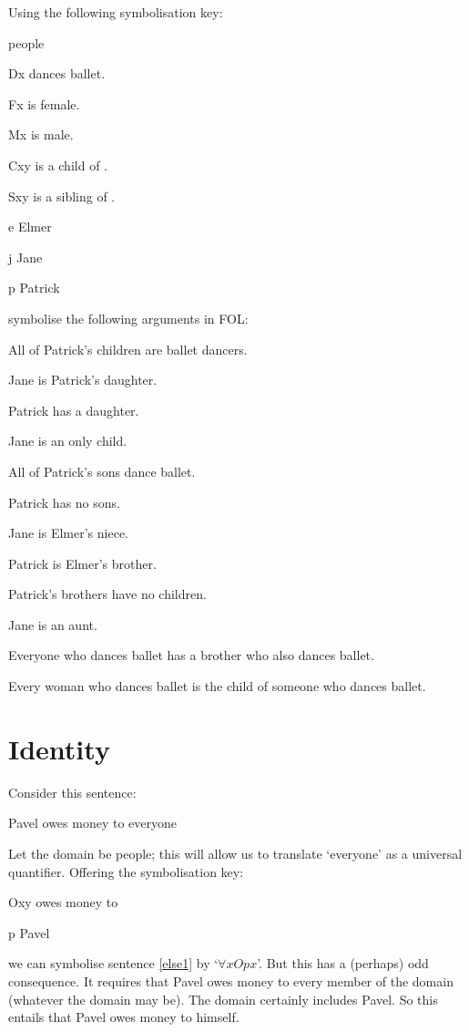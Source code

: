 \solutions
\problempart
\label{pr.FOLballet}
Using the following symbolisation key:
\begin{ekey}
\item[\text{domain}] people
\item[Dx]  dances ballet.
\item[Fx]  is female.
\item[Mx]  is male.
\item[Cxy]  is a child of .
\item[Sxy]  is a sibling of .
\item[e] Elmer
\item[j] Jane
\item[p] Patrick
\end{ekey}
symbolise the following arguments in FOL:
\begin{earg}
\item All of Patrick's children are ballet dancers.
\item Jane is Patrick's daughter.
\item Patrick has a daughter.
\item Jane is an only child.
\item All of Patrick's sons dance ballet.
\item Patrick has no sons.
\item Jane is Elmer's niece.
\item Patrick is Elmer's brother.
\item Patrick's brothers have no children.
\item Jane is an aunt.
\item Everyone who dances ballet has a brother who also dances ballet.
\item Every woman who dances ballet is the child of someone who dances ballet.
\end{earg}


\chapter{Identity}
\label{sec.identity}

Consider this sentence:
\begin{earg}
\item[\ex{else1}] Pavel owes money to everyone
\end{earg}
Let the domain be people; this will allow us to translate `everyone' as a universal quantifier. Offering the symbolisation key:
	\begin{ekey}
		\item[Oxy]  owes money to 
		\item[p] Pavel
	\end{ekey}
we can symbolise sentence \ref{else1} by `$\forall x Opx$'. But this has a (perhaps) odd consequence. It requires that Pavel owes money to every member of the domain (whatever the domain may be). The domain certainly includes Pavel. So this entails that Pavel owes money to himself. 

